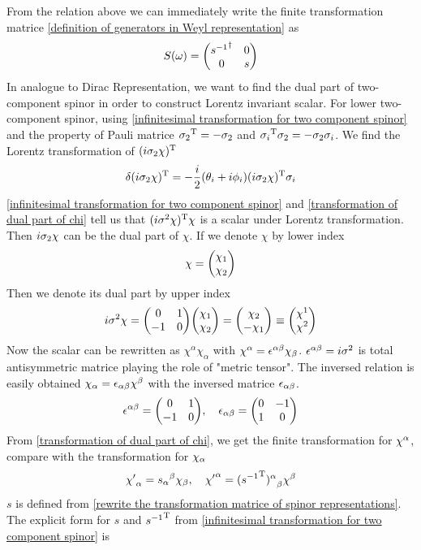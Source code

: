 From the relation above we can immediately write the finite transformation matrice \eqref{definition of generators in Weyl representation} as
\begin{equation} \label{rewrite the transformation matrice of spinor representations}
S(\w) = \mqty(
{s^{-1}}^{\dagger} &
0                           \\
0                  &
s )
\end{equation}
In analogue to Dirac Representation, we want to find the dual part of two-component spinor in order to construct Lorentz invariant scalar. For lower two-component spinor, using \eqref{infinitesimal transformation for two component spinor} and the property of Pauli matrice ${\sigma_{2}}^{\text{T}}=-\sigma_{2}$ and ${\sigma_{i}}^{\text{T}}\sigma_{2} = -\sigma_{2}\sigma_{i}$.
We find the Lorentz transformation of $(i\sigma_2\chi)^{\text{T}}$
\begin{equation} \label{transformation of dual part of chi}
\delta{(i\sigma_2\chi)^{\text{T}}}
=-\frac{i}{2} (\theta_i + i \phi_i)  (i\sigma_2 \chi)^{\text{T}} \sigma_{i}
\end{equation}
\eqref{infinitesimal transformation for two component spinor} and \eqref{transformation of dual part of chi} tell us that
$(i\sigma^2\chi)^{\text{T}}\chi$ is a scalar under Lorentz transformation. Then $i\sigma_2\chi$ can be the dual part of $\chi$.
If we denote $\chi$ by lower index
\begin{equation}
  \chi = \mqty(\chi_1 \\ \chi_2)
\end{equation}
Then we denote its dual part by upper index
\begin{equation}
  i\s^{2}\chi = \mqty(0 & 1 \\ -1 & 0)
\mqty(\chi_1 \\ \chi_2)
=\mqty(\chi_2 \\ -\chi_1)
\equiv \mqty(\chi^{1}\\\chi^{2})
\end{equation}
Now the scalar can be rewritten as $\chi^{\alpha} \chi_{\alpha}$
with $\chi^{\alpha} =  \epsilon^{\alpha\beta}\chi_{\beta}$. $\epsilon^{\alpha\beta} =i\sigma^{2} $ is total antisymmetric matrice playing the role of "metric tensor". The inversed relation is easily obtained $\chi_{\alpha} = \epsilon_{\alpha\beta}\chi^{\beta}$ with the inversed matrice $\epsilon_{\alpha\beta}$.
\begin{equation}\label{definition of undotted antisymmetric tensor}
  \e^{\a\be} = \mqty(0 & 1 \\ -1 & 0),\quad
  \e_{\a\be} =\mqty(0 & -1 \\ 1 & 0)
\end{equation}
From \eqref{transformation of dual part of chi}, we get the finite transformation for $\chi^{\alpha}$, compare with the transformation for $\chi_{\alpha}$
\begin{equation} \label{Lorentz transformation for chi}
{\chi'}_{\alpha} = {s_{\alpha}}^{\beta}\chi_{\beta}
,\quad
{\chi'}^{\alpha} = {({s^{-1}}^{\text{T}})^{\alpha}}_{\beta}\chi^{\beta}
\end{equation}
$s$ is defined from \eqref{rewrite the transformation matrice of spinor representations}. The explicit form for $s$ and
${s^{-1}}^{\text{T}}$ from \eqref{infinitesimal transformation for two component spinor} is

